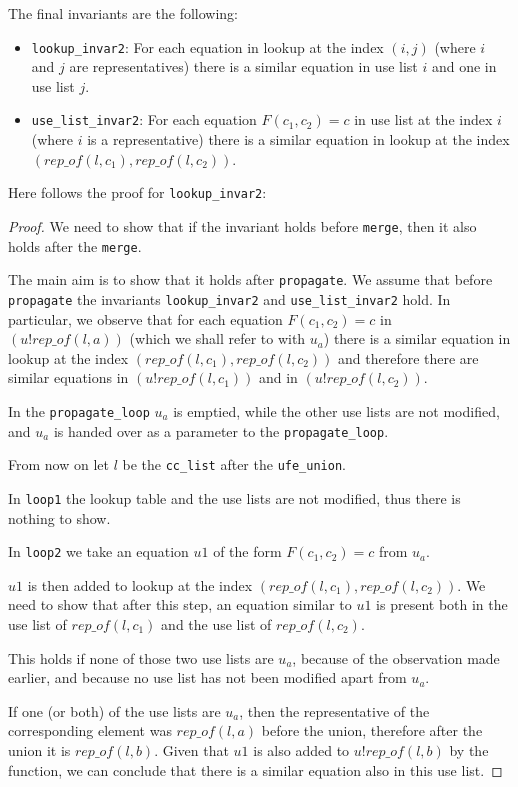 The final invariants are the following:
\begin{itemize}
    \item \lstinline{lookup_invar2}: For each equation in lookup at the index $(i, j)$ (where $i$ and $j$ are representatives) there is a similar equation in use list $i$ and one in use list $j$.
	\item \lstinline{use_list_invar2}: For each equation $F(c_1, c_2) = c$ in use list at the index $i$ (where $i$ is a representative) there is a similar equation in lookup at the index $(rep\_of(l, c_1), rep\_of(l, c_2))$.
\end{itemize}

Here follows the proof for \lstinline{lookup_invar2}:

\begin{proof}
We need to show that if the invariant holds before \lstinline{merge}, then it also holds after the \lstinline{merge}.

The main aim is to show that it holds after \lstinline{propagate}. We assume that before \lstinline{propagate} the invariants \lstinline{lookup_invar2} and \lstinline{use_list_invar2} hold. In particular, we observe that for each equation $F(c_1, c_2) = c$ in $(u ! rep\_of(l, a))$ (which we shall refer to with $u_a$) there is a similar equation in lookup at the index $(rep\_of(l, c_1), rep\_of(l, c_2))$ and therefore there are similar equations in $(u ! rep\_of(l, c_1))$ and in $(u ! rep\_of(l, c_2))$.

In the \lstinline{propagate_loop} $u_a$ is emptied, while the other use lists are not modified, and $u_a$ is handed over as a parameter to the \lstinline{propagate_loop}.

From now on let $l$ be the \lstinline{cc_list} after the \lstinline{ufe_union}.

In \lstinline{loop1} the lookup table and the use lists are not modified, thus there is nothing to show.

In \lstinline{loop2} we take an equation $u1$ of the form $F(c_1, c_2) = c$ from $u_a$.

$u1$ is then added to lookup at the index $(rep\_of(l, c_1), rep\_of(l, c_2))$. We need to show that after this step, an equation similar to $u1$ is present both in the use list of $rep\_of(l, c_1)$ and the use list of $rep\_of(l, c_2)$.

This holds if none of those two use lists are $u_a$, because of the observation made earlier, and because no use list has not been modified apart from $u_a$.

If one (or both) of the use lists are $u_a$, then the representative of the corresponding element was $rep\_of(l,a)$ before the union, therefore after the union it is $rep\_of(l,b)$. Given that $u1$ is also added to $u ! rep\_of(l, b)$ by the function, we can conclude that there is a similar equation also in this use list.
\end{proof}

